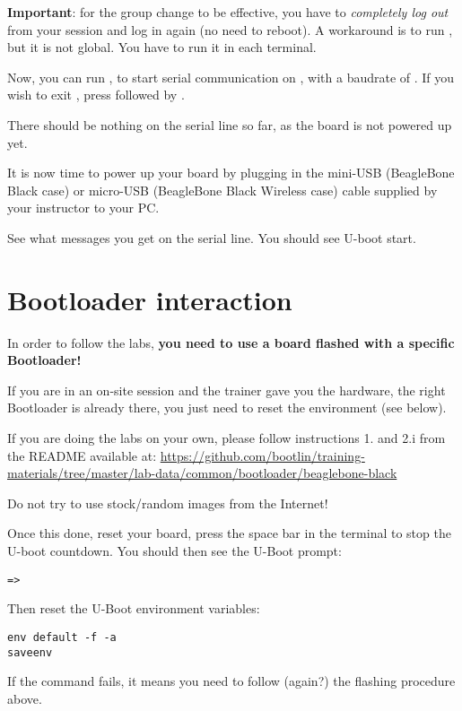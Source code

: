 {\bf Important}: for the group change to be effective, you have to
{\em completely log out} from your session and log in again (no need to
reboot). A workaround is to run , but it is not global.
You have to run it in each terminal.

Now, you can run , to start serial
communication on , with a baudrate of . If
you wish to exit , press \code{[Ctrl][a]} followed by
\code{[Ctrl][x]}.

There should be nothing on the serial line so far, as the board is not
powered up yet.

It is now time to power up your board by plugging in the mini-USB
(BeagleBone Black case) or micro-USB (BeagleBone Black Wireless case)
cable supplied by your instructor to your PC.

See what messages you get on the serial line. You should see U-boot
start.

\section{Bootloader interaction}

In order to follow the labs, {\bf you need to use a board flashed
with a specific Bootloader!}

If you are in an on-site session and the trainer gave you the hardware,
the right Bootloader is already there, you just need to reset the
environment (see below).

If you are doing the labs on your own, please follow instructions 1. and
2.i from the README available at:
\url{https://github.com/bootlin/training-materials/tree/master/lab-data/common/bootloader/beaglebone-black}

Do not try to use stock/random images from the Internet!

Once this done, reset your board, press the space bar in the
 terminal to stop the U-boot countdown. You should then
see the U-Boot prompt:

\begin{verbatim}
=>
\end{verbatim}

Then reset the U-Boot environment variables:

\begin{verbatim}
env default -f -a
saveenv
\end{verbatim}

If the  command fails, it means you need to follow
(again?) the flashing procedure above.

